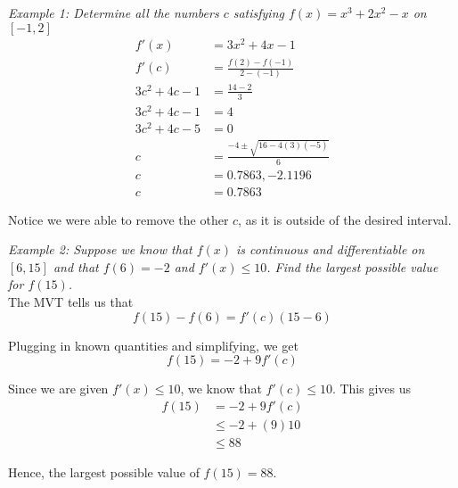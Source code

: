         \noindent \color{blue} \textit{Example 1: Determine all the numbers $c$ satisfying
        $f(x)=x^3+2x^2-x$ on $[-1,2]$} \color{black} \\

        \begin{align*}
            f'(x) &= 3x^2+4x-1 \\
            f'(c) &= \frac{f(2)-f(-1)}{2-(-1)} \\
            3c^2+4c-1 &= \frac{14-2}{3} \\
            3c^2+4c-1 &= 4 \\
            3c^2+4c-5 &= 0 \\
            c &= \frac{-4\pm\sqrt{16-4(3)(-5)}}{6} \\
            c &= 0.7863, -2.1196 \\
            c &= 0.7863
        \end{align*}

        \noindent Notice we were able to remove the other $c$, as it is outside of the desired interval.

        \noindent \color{blue} \textit{Example 2: Suppose we know that $f(x)$ is continuous and
        differentiable on $[6,15]$ and that $f(6)=-2$ and $f'(x)\leq10$. Find the
        largest possible value for $f(15)$.} \color{black} \\

        \noindent The MVT tells us that \\

        \begin{equation*}
            f(15) - f(6) = f'(c)(15-6)
        \end{equation*}

        \noindent Plugging in known quantities and simplifying, we get \\

        \begin{equation*}
            f(15) = -2 + 9f'(c)
        \end{equation*}

        \noindent Since we are given $f'(x)\leq 10$, we know that $f'(c)\leq 10$. This gives us \\

        \begin{align*}
            f(15) &= -2 + 9f'(c) \\
            &\leq -2 + (9)10 \\
            &\leq 88
        \end{align*}

        \noindent Hence, the largest possible value of $f(15)=88$.